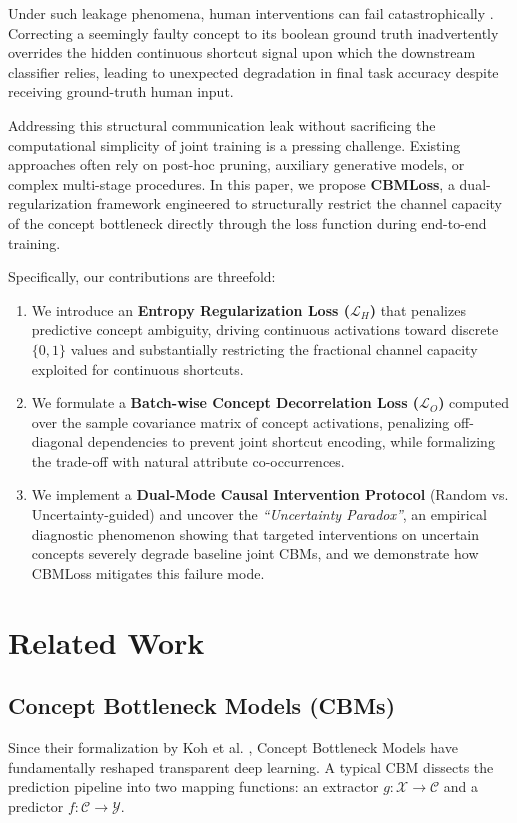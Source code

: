 \documentclass[times,twocolumn,final]{elsarticle}
\begin{document}
Under such leakage phenomena, human interventions can fail catastrophically \citep{oikarinen2023label}. Correcting a seemingly faulty concept to its boolean ground truth inadvertently overrides the hidden continuous shortcut signal upon which the downstream classifier relies, leading to unexpected degradation in final task accuracy despite receiving ground-truth human input.

Addressing this structural communication leak without sacrificing the computational simplicity of joint training is a pressing challenge. Existing approaches often rely on post-hoc pruning, auxiliary generative models, or complex multi-stage procedures. In this paper, we propose \textbf{CBMLoss}, a dual-regularization framework engineered to structurally restrict the channel capacity of the concept bottleneck directly through the loss function during end-to-end training.

Specifically, our contributions are threefold:
\begin{enumerate}
    \item We introduce an \textbf{Entropy Regularization Loss ($\mathcal{L}_H$)} that penalizes predictive concept ambiguity, driving continuous activations toward discrete $\{0, 1\}$ values and substantially restricting the fractional channel capacity exploited for continuous shortcuts.
    \item We formulate a \textbf{Batch-wise Concept Decorrelation Loss ($\mathcal{L}_O$)} computed over the sample covariance matrix of concept activations, penalizing off-diagonal dependencies to prevent joint shortcut encoding, while formalizing the trade-off with natural attribute co-occurrences.
    \item We implement a \textbf{Dual-Mode Causal Intervention Protocol} (Random vs. Uncertainty-guided) and uncover the \textit{``Uncertainty Paradox''}, an empirical diagnostic phenomenon showing that targeted interventions on uncertain concepts severely degrade baseline joint CBMs, and we demonstrate how CBMLoss mitigates this failure mode.
\end{enumerate}

\section{Related Work}
\label{sec:related}

\subsection{Concept Bottleneck Models (CBMs)}
Since their formalization by Koh et al. \citep{koh2020concept}, Concept Bottleneck Models have fundamentally reshaped transparent deep learning. A typical CBM dissects the prediction pipeline into two mapping functions: an extractor $g: \mathcal{X} \rightarrow \mathcal{C}$ and a predictor $f: \mathcal{C} \rightarrow \mathcal{Y}$. 
\end{document}
